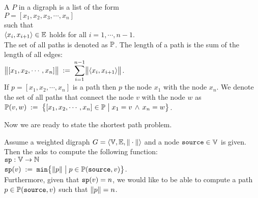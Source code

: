 \begin{Definition}
 A  $P$ in a digraph is a list of the form 
\\[0.2cm]
\hspace*{1.3cm} 
$P = [ x_1, x_2, x_3, \cdots, x_n ]$ 
\\[0.2cm]
such that
\\[0.2cm]
\hspace*{1.3cm} $\pair(x_i,x_{i+1}) \in \edges$ \quad holds for all $i = 1, \cdots, n-1$. 
\\[0.2cm]
The set of all paths is denoted as ${\mathbb P}$.
The length of a path is the sum of the length of all edges:
\\[0.2cm]
\hspace*{1.3cm}
$\ds\Weight{[x_1,x_2, \cdots, x_n]} \df \sum\limits_{i=1}^{n-1} \Weight{\pair(x_i,x_{i+1})}$. 
\\[0.2cm]
If  $p = [x_1, x_2, \cdots, x_n]$ is a path then  $p$  the node $x_1$ with the node
$x_n$.  We denote the set of all paths that connect the node $v$ with the node $w$ as
\\[0.2cm]
\hspace*{1.3cm} 
 ${\mathbb P}(v,w) \;:=\; \bigl\{ [x_1, x_2, \cdots, x_n] \in {\mathbb P} \bigm| x_1 = v \,\wedge\, x_n = w \bigr\}$.
\end{Definition}

\noindent
Now we are ready to state the shortest path problem.

\begin{Definition} \lb
  Assume a weighted digraph  
  $G = \langle {\mathbb V}, {\mathbb E}, \|\cdot\| \rangle$ 
  and a node $\mbox{\tt source} \in {\mathbb V}$ is given.  Then the  asks to compute
  the following function:
  \\[0.2cm]
  \hspace*{1.3cm} $\mathtt{sp}: {\mathbb V} \rightarrow {\mathbb N}$ \\[0.1cm]
  \hspace*{1.3cm} $\mathtt{sp}(v) \;:=\; \texttt{min}\bigl\{ \|p\| \bigm| p \in {\mathbb P}(\mbox{\tt source},v) \bigr\}$.
  \\[0.2cm]
  Furthermore, given that $\mathtt{sp}(v) = n$, we would like to be able to compute a path 
  $p \in {\mathbb P}(\mbox{\tt source},v)$ such that $\|p\| = n$.
  \eox
\end{Definition}


